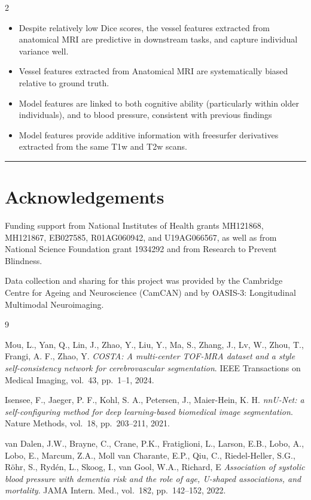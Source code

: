 \documentclass[a0, portrait]{a0poster}
\begin{document}
\begin{multicols}{2}
\begin{itemize}
\normalsize
    \item Despite relatively low Dice scores, the vessel features extracted from
    anatomical MRI are predictive in downstream tasks, and capture individual variance well.
    \item Vessel features extracted from Anatomical MRI are systematically biased
    relative to ground truth.
    \item Model features are linked to both cognitive ability (particularly within older individuals),
    and to blood pressure, consistent with previous findings \cite{ref3}
    \item Model features provide additive information with freesurfer derivatives
    extracted from the same T1w and T2w scans.
\end{itemize}

\color{Black}
\rule{\linewidth}{2pt}
\section*{Acknowledgements}

Funding support from National Institutes of Health grants MH121868, MH121867, EB027585, R01AG060942, and U19AG066567, as well as from National
Science Foundation grant 1934292 and from Research to Prevent Blindness.

Data collection and sharing for this project was provided by the Cambridge Centre for Ageing and Neuroscience (CamCAN) and by OASIS-3: Longitudinal Multimodal Neuroimaging.

\begin{thebibliography}{9}
\footnotesize

Mou, L., Yan, Q., Lin, J., Zhao, Y., Liu, Y., Ma, S., Zhang, J., Lv, W., Zhou, T., Frangi, A. F., Zhao, Y.
\textit{COSTA: A multi-center TOF-MRA dataset and a style self-consistency network for cerebrovascular segmentation}.
IEEE Transactions on Medical Imaging, vol.~43, pp.~1--1, 2024.

Isensee, F., Jaeger, P. F., Kohl, S. A., Petersen, J., Maier-Hein, K. H.
\textit{nnU-Net: a self-configuring method for deep learning-based biomedical image segmentation}.
Nature Methods, vol.~18, pp.~203--211, 2021.

van Dalen, J.W., Brayne, C., Crane, P.K., Fratiglioni, L., Larson, E.B., Lobo, A., Lobo, E., Marcum, Z.A., Moll van Charante, E.P., Qiu, C., Riedel-Heller, S.G., Röhr, S., Rydén, L., Skoog, I., van Gool, W.A., Richard, E
\textit{Association of systolic blood pressure with dementia risk and the role of age, {U}-shaped associations, and mortality}.
JAMA Intern. Med., vol.~182, pp.~142--152, 2022.



\end{thebibliography}
\end{multicols}
\end{document}
